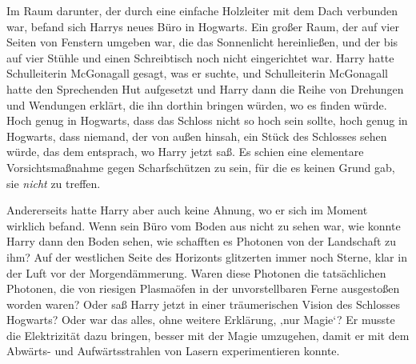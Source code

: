 Im Raum darunter, der durch eine einfache Holzleiter mit dem Dach verbunden war, befand sich Harrys neues Büro in Hogwarts. Ein großer Raum, der auf vier Seiten von Fenstern umgeben war, die das Sonnenlicht hereinließen, und der bis auf vier Stühle und einen Schreibtisch noch nicht eingerichtet war. Harry hatte Schulleiterin McGonagall gesagt, was er suchte, und Schulleiterin McGonagall hatte den Sprechenden Hut aufgesetzt und Harry dann die Reihe von Drehungen und Wendungen erklärt, die ihn dorthin bringen würden, wo es finden würde. Hoch genug in Hogwarts, dass das Schloss nicht so hoch sein sollte, hoch genug in Hogwarts, dass niemand, der von außen hinsah, ein Stück des Schlosses sehen würde, das dem entsprach, wo Harry jetzt saß. Es schien eine elementare Vorsichtsmaßnahme gegen Scharfschützen zu sein, für die es keinen Grund gab, sie \emph{nicht} zu treffen.

Andererseits hatte Harry aber auch keine Ahnung, wo er sich im Moment wirklich befand. Wenn sein Büro vom Boden aus nicht zu sehen war, wie konnte Harry dann den Boden sehen, wie schafften es Photonen von der Landschaft zu ihm? Auf der westlichen Seite des Horizonts glitzerten immer noch Sterne, klar in der Luft vor der Morgendämmerung. Waren diese Photonen die tatsächlichen Photonen, die von riesigen Plasmaöfen in der unvorstellbaren Ferne ausgestoßen worden waren? Oder saß Harry jetzt in einer träumerischen Vision des Schlosses Hogwarts? Oder war das alles, ohne weitere Erklärung, ‚nur Magie‘? Er musste die Elektrizität dazu bringen, besser mit der Magie umzugehen, damit er mit dem Abwärts- und Aufwärtsstrahlen von Lasern experimentieren konnte.


